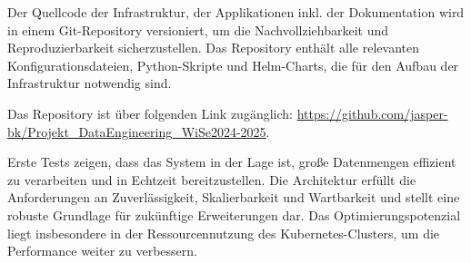 \documentclass[%
pdftex,
oneside,			%
11pt,				%
parskip=half,		%
headheight = 12pt,	%
headsepline,		%
footsepline,		%
footheight = 16pt,	%
abstracton,		%
DIV=calc,		%
BCOR=8mm,		%
headinclude=false,	%
footinclude=false,	%
listof=totoc,		%
toc=bibliography,	%
]{scrreprt}	%
\begin{document}
    Der Quellcode der Infrastruktur, der Applikationen inkl. der Dokumentation wird in einem Git-Repository versioniert, um die Nachvollziehbarkeit und Reproduzierbarkeit sicherzustellen.
    Das Repository enthält alle relevanten Konfigurationsdateien, Python-Skripte und Helm-Charts, die für den Aufbau der Infrastruktur notwendig sind.

    Das Repository ist über folgenden Link zugänglich:
    \url{https://github.com/jasper-bk/Projekt_DataEngineering_WiSe2024-2025}. %

    Erste Tests zeigen, dass das System in der Lage ist, große Datenmengen effizient zu verarbeiten und in Echtzeit bereitzustellen.
    Die Architektur erfüllt die Anforderungen an Zuverlässigkeit, Skalierbarkeit und Wartbarkeit und stellt eine robuste Grundlage für zukünftige Erweiterungen dar.
    Das Optimierungspotenzial liegt insbesondere in der Ressourcennutzung des Kubernetes-Clusters, um die Performance weiter zu verbessern.



\ifx\VAlterZitierstil\VTrueValue
    \printbibliography
\else
    
    
\fi
\end{document}
